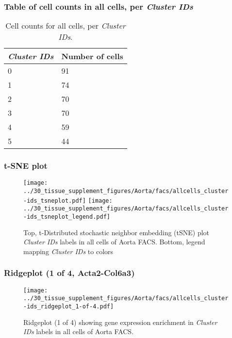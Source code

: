 \subsubsection{Table of cell counts in all cells, per \emph{Cluster IDs}}\begin{table}[h]
\centering
\label{my-label}
\begin{tabular}{@{}ll@{}}
\toprule

\emph{Cluster IDs}& Number of cells \\ \midrule
0 & 91 \\

1 & 74 \\

2 & 70 \\

3 & 70 \\

4 & 59 \\

5 & 44 \\
\bottomrule
\end{tabular}
\caption{Cell counts for all cells, per \emph{Cluster IDs}.}
\end{table}

\clearpage
\subsubsection{t-SNE plot}
\begin{figure}[h]
\centering
\texttt{[image: ../30\_tissue\_supplement\_figures/Aorta/facs/allcells\_cluster-ids\_tsneplot.pdf]}
\texttt{[image: ../30\_tissue\_supplement\_figures/Aorta/facs/allcells\_cluster-ids\_tsneplot\_legend.pdf]}
\caption{Top, t-Distributed stochastic neighbor embedding (tSNE) plot  \emph{Cluster IDs} labels in all cells of Aorta FACS. Bottom, legend mapping \emph{Cluster IDs} to colors}
\end{figure}


\clearpage

\subsubsection{Ridgeplot (1 of 4, Acta2-Col6a3)}
\begin{figure}[h]
\centering
\texttt{[image: ../30\_tissue\_supplement\_figures/Aorta/facs/allcells\_cluster-ids\_ridgeplot\_1-of-4.pdf]}

\caption{ Ridgeplot (1 of 4)  showing gene expression enrichment in \emph{Cluster IDs} labels in all cells of Aorta FACS. }
\end{figure}


